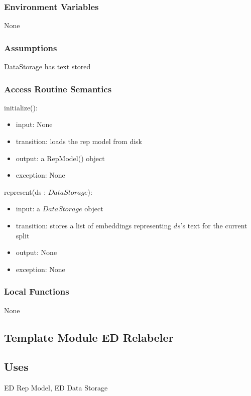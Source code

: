 \documentclass[12pt, titlepage]{article}
\begin{document}
\subsubsection{Environment Variables}

None

\subsubsection{Assumptions}

DataStorage has text stored

\subsubsection{Access Routine Semantics}

\noindent initialize():
\begin{itemize}
\item input: None
\item transition: loads the rep model from disk
\item output: a RepModel() object
\item exception: None
\end{itemize}

\noindent represent(ds : $DataStorage$):
\begin{itemize}
\item input: a $DataStorage$ object
\item transition: stores a list of embeddings representing $ds$'s text for the current split
\item output: None
\item exception: None
\end{itemize}

\subsubsection{Local Functions}

None


\subsection{Template Module ED Relabeler}

\subsection{Uses}

ED Rep Model, ED Data Storage
\end{document}
